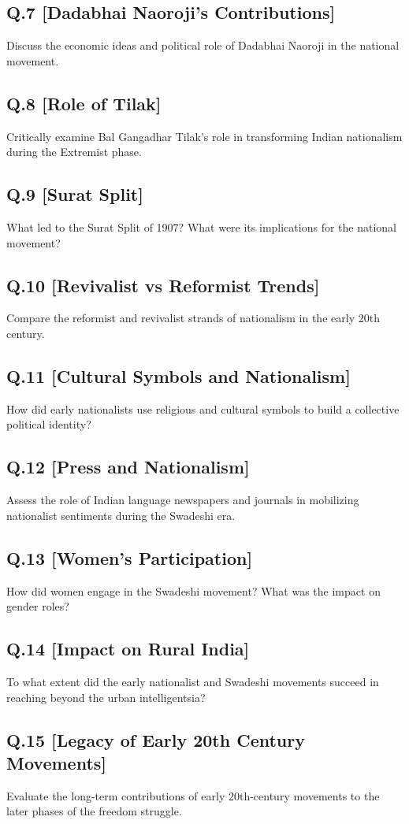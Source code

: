 \subsection*{Q.7 [Dadabhai Naoroji’s Contributions]}
Discuss the economic ideas and political role of Dadabhai Naoroji in the national movement.

\subsection*{Q.8 [Role of Tilak]}
Critically examine Bal Gangadhar Tilak’s role in transforming Indian nationalism during the Extremist phase.

\subsection*{Q.9 [Surat Split]}
What led to the Surat Split of 1907? What were its implications for the national movement?

\subsection*{Q.10 [Revivalist vs Reformist Trends]}
Compare the reformist and revivalist strands of nationalism in the early 20th century.

\subsection*{Q.11 [Cultural Symbols and Nationalism]}
How did early nationalists use religious and cultural symbols to build a collective political identity?

\subsection*{Q.12 [Press and Nationalism]}
Assess the role of Indian language newspapers and journals in mobilizing nationalist sentiments during the Swadeshi era.

\subsection*{Q.13 [Women's Participation]}
How did women engage in the Swadeshi movement? What was the impact on gender roles?

\subsection*{Q.14 [Impact on Rural India]}
To what extent did the early nationalist and Swadeshi movements succeed in reaching beyond the urban intelligentsia?

\subsection*{Q.15 [Legacy of Early 20th Century Movements]}
Evaluate the long-term contributions of early 20th-century movements to the later phases of the freedom struggle.
